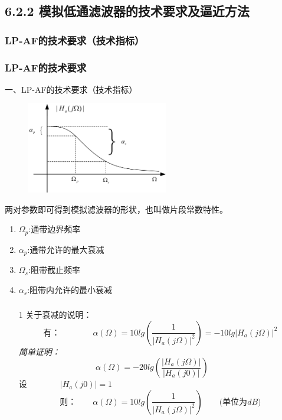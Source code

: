 \documentclass[notheorems,compress,mathserif,table]{beamer}
\begin{document}

\subsection{6.2.2 模拟低通滤波器的技术要求及逼近方法}

\subsubsection*{LP-AF的技术要求（技术指标）}

\begin{frame}\frametitle{LP-AF的技术要求}%
{\heiti 一、LP-AF的技术要求（技术指标）}
\begin{figure}[h]
  \centering
  \includegraphics[width=0.55\textwidth]{fig6_lpafjszb.jpg}
\end{figure}
两对参数即可得到模拟滤波器的形状，也叫做片段常数特性。
\begin{enumerate}
  \item $\Omega_{p}$:通带边界频率
  \item $\alpha_{p}$:通带允许的最大衰减
  \item $\Omega_{s}$:阻带截止频率
  \item $\alpha_{s}$:阻带内允许的最小衰减
\end{enumerate}
\end{frame}


\begin{frame}\frametitle{}%
\begin{enumerate}
\item [1]关于衰减的说明：
$$\mbox{有：}\quad\quad\quad\quad
\alpha(\Omega) = 10 lg\left(\frac{1}{|H_{a}(j\Omega)|^{2}}\right)= - 10 lg\left|H_{a}(j\Omega)\right|^{2}$$
\emph{ 简单证明：}
$$\alpha(\Omega)
= -20 lg\left(\frac{|H_{a}(j\Omega)|}{|H_{a}(j0)|}\right)\quad\quad$$
设$\quad\quad\quad\quad|H_{a}(j0)|=1 $
$$\mbox{则：}\quad\quad\alpha(\Omega)= 10 lg(\frac{1}{|H_{a}(j\Omega)|^{2}})
\quad\quad\mbox{(单位为$dB$)}$$
\end{enumerate}
\end{frame}
\end{document}
